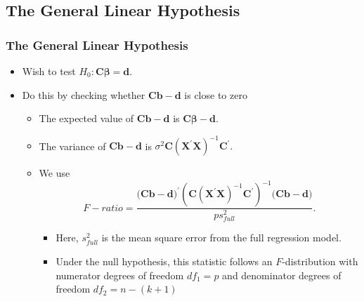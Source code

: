 \subsection{The General Linear Hypothesis}

\begin{frame}%
 \frametitle{The General Linear Hypothesis}
\begin{itemize}
\item Wish to test $H_{0}:\mathbf{C \boldsymbol \beta =d}$.
\item Do this by checking whether $\mathbf{C b -d}$ is close to zero
\begin{itemize}
\item The expected value of $\mathbf{C b -d}$ is $\mathbf{C \boldsymbol \beta -d}.$
\item The variance of  $\mathbf{C b -d}$ is $\sigma^2 \mathbf{C}
\left( \mathbf{X}^{\prime} \mathbf{X} \right)^{-1}
\mathbf{C}^{\prime}.$
\item We use
\begin{equation*}
F-ratio=\frac{(\mathbf{Cb-d)}^{\prime }\left( \mathbf{C}\left(
\mathbf{X^{\prime }X} \right) ^{-1}\mathbf{C}^{\prime }\right)
^{-1}(\mathbf{Cb-d)}}{ps_{full}^{2}}.
\end{equation*}
\begin{itemize}
\item Here, $s_{full}^{2}$ is the mean square error from the full
regression model.
\item Under the null hypothesis, this statistic follows an $F$-distribution with
numerator degrees of freedom $df_{1}=p$ and denominator degrees of
freedom $df_{2}=n-(k+1)$
  \end{itemize}
  \end{itemize}
  \end{itemize}
\end{frame}



